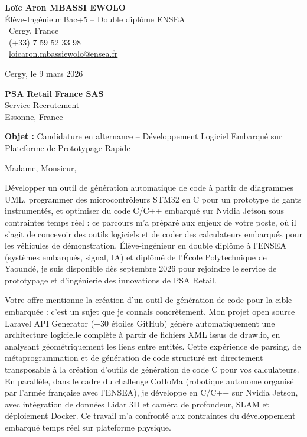 \documentclass[a4paper,11pt]{article}
\begin{document}
\noindent
\begin{minipage}[t]{0.5\textwidth}
    \textbf{Loïc Aron MBASSI EWOLO}\\
    Élève-Ingénieur Bac+5 -- Double diplôme ENSEA\\[3pt]
    \faMapMarker\ Cergy, France\\
    \faPhone\ (+33) 7 59 52 33 98\\
    \faEnvelope\ \href{mailto:loicaron.mbassiewolo@ensea.fr}{loicaron.mbassiewolo@ensea.fr}
\end{minipage}
\hfill
\begin{minipage}[t]{0.4\textwidth}
    \raggedleft
    Cergy, le 9 mars 2026
\end{minipage}

\vspace{1.2cm}

\hfill
\begin{minipage}[t]{0.5\textwidth}
    \raggedleft
    \textbf{PSA Retail France SAS}\\
    Service Recrutement\\
    Essonne, France
\end{minipage}

\vspace{1cm}

\noindent\textbf{Objet :} Candidature en alternance -- Développement Logiciel Embarqué sur Plateforme de Prototypage Rapide

\vspace{0.8cm}

Madame, Monsieur,

Développer un outil de génération automatique de code à partir de diagrammes UML, programmer des microcontrôleurs STM32 en C pour un prototype de gants instrumentés, et optimiser du code C/C++ embarqué sur Nvidia Jetson sous contraintes temps réel : ce parcours m'a préparé aux enjeux de votre poste, où il s'agit de concevoir des outils logiciels et de coder des calculateurs embarqués pour les véhicules de démonstration. Élève-ingénieur en double diplôme à l'ENSEA (systèmes embarqués, signal, IA) et diplômé de l'École Polytechnique de Yaoundé, je suis disponible dès septembre 2026 pour rejoindre le service de prototypage et d'ingénierie des innovations de PSA Retail.

Votre offre mentionne la création d'un outil de génération de code pour la cible embarquée : c'est un sujet que je connais concrètement. Mon projet open source Laravel API Generator (+30 étoiles GitHub) génère automatiquement une architecture logicielle complète à partir de fichiers XML issus de draw.io, en analysant géométriquement les liens entre entités. Cette expérience de parsing, de métaprogrammation et de génération de code structuré est directement transposable à la création d'outils de génération de code C pour vos calculateurs. En parallèle, dans le cadre du challenge CoHoMa (robotique autonome organisé par l'armée française avec l'ENSEA), je développe en C/C++ sur Nvidia Jetson, avec intégration de données Lidar 3D et caméra de profondeur, SLAM et déploiement Docker. Ce travail m'a confronté aux contraintes du développement embarqué temps réel sur plateforme physique.
\end{document}
